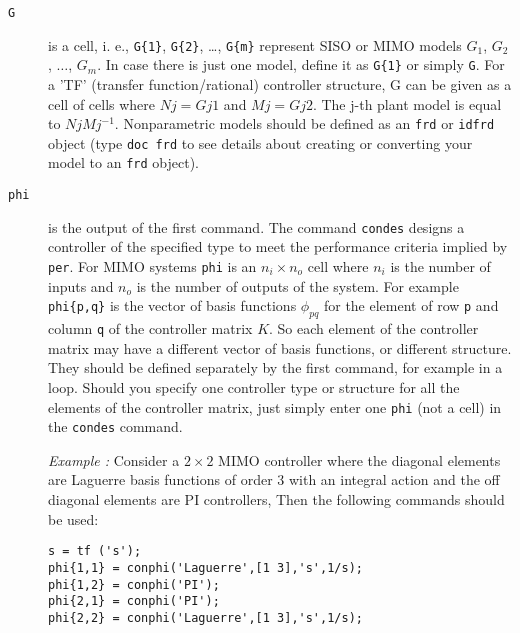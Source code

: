 \documentclass [12pt , a4paper] {report}
\begin{document}
\begin{description}
\item[\texttt{G}] is a cell, i. e., \texttt{G\{1\}}, \texttt{G\{2\}}, \dots, \texttt{G\{m\}} represent SISO or MIMO models $G_1$, $G_2$, $\ldots$, $G_m$. In case there is just one model, define it as \texttt{G\{1\}} or simply \texttt{G}.
For a 'TF' (transfer function/rational) controller structure, G can be given as a cell of cells where $N{j}=G{j}{1}$ and $M{j}=G{j}{2}$. The j-th plant model is equal to $N{j} M{j}^{-1}$.
Nonparametric models should be defined as an \texttt{frd} or  \texttt{idfrd} object (type \texttt{doc frd} to see details about creating or converting your model to an \texttt{frd} object).

\item[\texttt{phi}] is the output of the first command. The command \texttt{condes} designs a controller of the specified type to meet the performance criteria implied by \texttt{per}. For MIMO systems \texttt{phi} is an $n_i \times n_o$ cell where $n_i$ is the number of inputs and $n_o$ is the number of outputs of the system. For example \texttt{phi\{p,q\}} is the vector of basis functions $\phi_{pq}$ for the element of row \texttt{p} and column \texttt{q} of the controller matrix $K$. So each element of the controller matrix may have a different vector of basis functions, or different structure. They should be defined separately by the first command, for example in a loop. Should you specify one controller type or structure for all the elements of the controller matrix, just simply enter one \texttt{phi} (not a cell) in the \texttt{condes} command. 

{\it Example :} Consider a $2 \times 2$ MIMO controller where the diagonal elements are Laguerre basis functions of order 3 with an integral action and the off diagonal elements are PI controllers, Then the following commands should be used:

\begin{lstlisting}
s = tf ('s');
phi{1,1} = conphi('Laguerre',[1 3],'s',1/s);
phi{1,2} = conphi('PI');
phi{2,1} = conphi('PI');
phi{2,2} = conphi('Laguerre',[1 3],'s',1/s);
\end{lstlisting}


\end{description}
\end{document}
